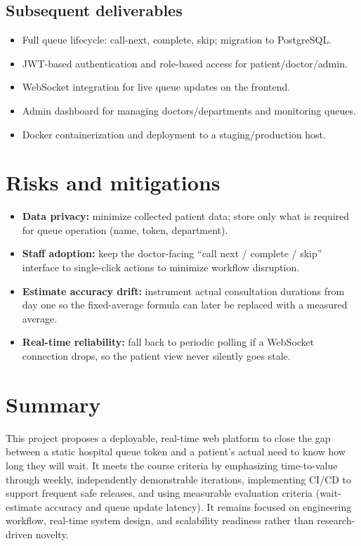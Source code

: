 \documentclass[11pt,a4paper]{article}
\begin{document}
\subsection{Subsequent deliverables}
\begin{itemize}[leftmargin=0.7cm]
    \item Full queue lifecycle: call-next, complete, skip; migration to PostgreSQL.
    \item JWT-based authentication and role-based access for patient/doctor/admin.
    \item WebSocket integration for live queue updates on the frontend.
    \item Admin dashboard for managing doctors/departments and monitoring queues.
    \item Docker containerization and deployment to a staging/production host.
\end{itemize}

\section{Risks and mitigations}
\begin{itemize}[leftmargin=0.7cm]
    \item \textbf{Data privacy:} minimize collected patient data; store only what is required for queue operation (name, token, department).
    \item \textbf{Staff adoption:} keep the doctor-facing ``call next / complete / skip'' interface to single-click actions to minimize workflow disruption.
    \item \textbf{Estimate accuracy drift:} instrument actual consultation durations from day one so the fixed-average formula can later be replaced with a measured average.
    \item \textbf{Real-time reliability:} fall back to periodic polling if a WebSocket connection drops, so the patient view never silently goes stale.
\end{itemize}

\section{Summary}
This project proposes a deployable, real-time web platform to close the gap between a static hospital queue token and a patient's actual need to know how long they will wait. It meets the course criteria by emphasizing time-to-value through weekly, independently demonstrable iterations, implementing CI/CD to support frequent safe releases, and using measurable evaluation criteria (wait-estimate accuracy and queue update latency). It remains focused on engineering workflow, real-time system design, and scalability readiness rather than research-driven novelty.
\end{document}
